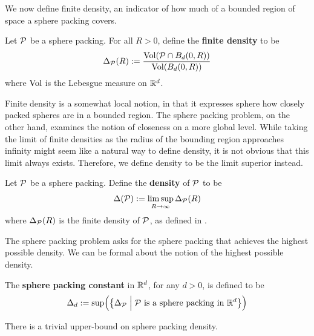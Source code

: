 We now define finite density, an indicator of how much of a bounded region of space a sphere packing covers.

\begin{boxdefinition}\label{Ch2:Def:FiniteDensity}
    Let $\mathcal{P}$ be a sphere packing. For all $R > 0$, define the \textbf{finite density} to be
    \begin{align*}
        \Delta_{\mathcal{P}}(R) := \frac{\operatorname{Vol}\!\left( \mathcal{P} \cap B_d(0, R) \right)}{\operatorname{Vol}\!\left( B_d(0, R) \right)}
    \end{align*}
    where $\operatorname{Vol}$ is the Lebesgue measure on $\mathbb{R}^d$.
\end{boxdefinition}

Finite density is a somewhat local notion, in that it expresses sphere how closely packed spheres are in a bounded region. The sphere packing problem, on the other hand, examines the notion of closeness on a more global level. While taking the limit of finite densities as the radius of the bounding region approaches infinity might seem like a natural way to define density, it is not obvious that this limit always exists. Therefore, we define density to be the limit superior instead.

\begin{boxdefinition}[Density]\label{Ch2:Def:Density}
    Let $\mathcal{P}$ be a sphere packing. Define the \textbf{density} of $\mathcal{P}$ to be
    \begin{align*}
        \Delta(\mathcal{P}) := \limsup_{R \to \infty} \Delta_{\mathcal{P}}(R)
    \end{align*}
    where $\Delta_{\mathcal{P}}(R)$ is the finite density of $\mathcal{P}$, as defined in .
\end{boxdefinition}

The sphere packing problem asks for the sphere packing that achieves the highest possible density. We can be formal about the notion of the highest possible density.

\begin{boxdefinition}
    The \textbf{sphere packing constant} in $\mathbb{R}^d$, for any $d > 0$, is defined to be
    \begin{align*}
        \Delta_d := \sup\!\left( {\left\{ \Delta_{\mathcal{P}} \; \middle\vert \; \mathcal{P} \text{ is a sphere packing in } \mathbb{R}^d \right\}} \right)
    \end{align*}
\end{boxdefinition}

There is a trivial upper-bound on sphere packing density.

